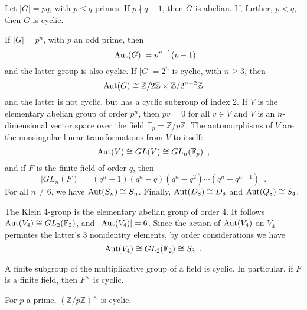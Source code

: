 \begin{corollary} \cite[136]{DummitFoote2004} Let $|G| = pq$, with $p \leq q$ primes. If $p \nmid q - 1$, then $G$ is abelian. If, further, $p < q$, then $G$ is cyclic.
\end{corollary}

\begin{proposition} \cite[136]{DummitFoote2004} If $|G| = p^n$, with $p$ an odd prime, then
$$
|\operatorname{Aut}(G)| = p^{n - 1} (p - 1)
$$
and the latter group is also cyclic. If $|G| = 2^n$ is cyclic, with $n \geq 3$, then
$$
\operatorname{Aut}(G) \cong \mathbb{Z} / 2 \mathbb{Z} \times \mathbb{Z} / 2^{n - 2} \mathbb{Z}
$$
and the latter is not cyclic, but has a cyclic subgroup of index 2. If $V$ is the elementary abelian group of order $p^n$, then $pv = 0$ for all $v \in V$ and $V$ is an $n$-dimensional vector space over the field $\mathbb{F}_p = \mathbb{Z} / p \mathbb{Z}$. The automorphisms of $V$ are the nonsingular linear transformations from $V$ to itself:
$$
\operatorname{Aut}(V) \cong GL(V) \cong GL_n(\mathbb{F}_p) \enspace,
$$
and if $F$ is the finite field of order $q$, then
$$
|GL_n(F)| = (q^n - 1) (q^n - q) (q^n - q^2) \cdots (q^n - q^{n - 1}) \enspace.
$$
For all $n \ne 6$, we have $\operatorname{Aut}(S_n) \cong S_n$. Finally, $\operatorname{Aut}(D_8) \cong D_8$ and $\operatorname{Aut}(Q_8) \cong S_4$.
\end{proposition}

\begin{example} \cite[137]{DummitFoote2004} The Klein 4-group is the elementary abelian group of order 4. It follows $\operatorname{Aut}(V_4) \cong GL_2(\mathbb{F}_2)$, and $|\operatorname{Aut}(V_4)| = 6$. Since the action of $\operatorname{Aut}(V_4)$ on $V_4$ permutes the latter's 3 nonidentity elements, by order considerations we have
$$
\operatorname{Aut}(V_4) \cong GL_2(\mathbb{F}_2) \cong S_3 \enspace.
$$
\end{example}

\begin{proposition} \cite[314]{DummitFoote2004} A finite subgroup of the multiplicative group of a field is cyclic. In particular, if $F$ is a finite field, then $F^\times$ is cyclic.
\end{proposition}

\begin{corollary} \cite[314]{DummitFoote2004} For $p$ a prime, $(\mathbb{Z} / p \mathbb{Z})^\times$ is cyclic.
\end{corollary}




